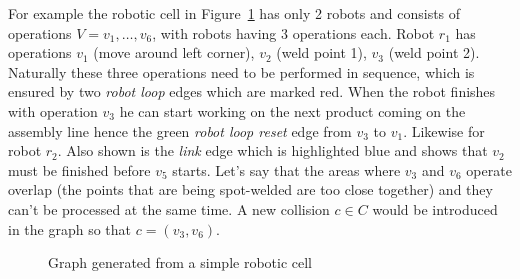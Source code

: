 For example the robotic cell in Figure~\ref{fig:examplegraph} has only 2 robots and consists of operations $V = v_1, \dots, v_6$, with robots having 3 operations each. 
Robot $r_1$ has operations $v_1$ (move around left corner), $v_2$ (weld point 1), $v_3$ (weld point 2). 
Naturally these three operations need to be performed in sequence, which is ensured by two  \emph{robot loop} edges which are marked red. 
When the robot finishes with operation $v_3$ he can start working on the next product coming on the assembly line hence the green \emph{robot loop reset} edge from $v_3$ to $v_1$.
Likewise for robot $r_2$. 
Also shown is the \emph{link} edge which is highlighted blue and shows that $v_2$ must be finished before $v_5$ starts.
Let's say that the areas where $v_3$ and $v_6$ operate overlap (the points that are being spot-welded are too close together) and they can't be processed at the same time. 
A new collision $c \in C$ would be introduced in the graph so that $c = (v_3, v_6)$.

\begin{figure}
    \centering
    
    \caption{Graph generated from a simple robotic cell}
    \label{fig:examplegraph}
\end{figure}
